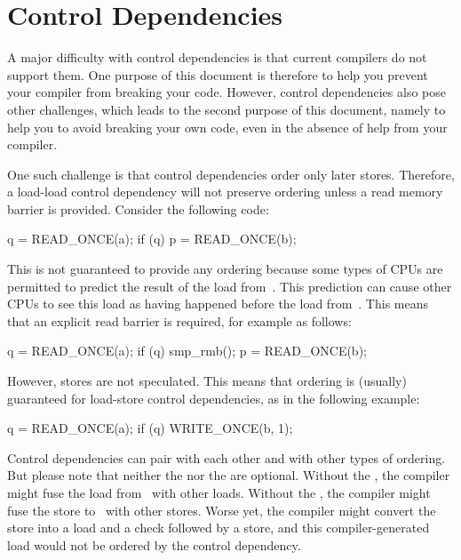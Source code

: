 \chapter{Control Dependencies}

A major difficulty with control dependencies is that current compilers
do not support them.
One purpose of this document is therefore to help you prevent your
compiler from breaking your code.
However, control dependencies also pose other challenges, which leads to the
second purpose of this document, namely to help you to avoid breaking
your own code, even in the absence of help from your compiler.

One such challenge is that control dependencies order only later stores.
Therefore, a load-load control dependency will not preserve ordering
unless a read memory barrier is provided.
Consider the following code:

\begin{VerbatimU}
	q = READ_ONCE(a);
	if (q)
		p = READ_ONCE(b);
\end{VerbatimU}

This is not guaranteed to provide any ordering because some types of CPUs
are permitted to predict the result of the load from~.
This prediction can cause other CPUs to see this load as having happened
before the load from~.
This means that an explicit read barrier is required, for example as follows:

\begin{VerbatimU}
	q = READ_ONCE(a);
	if (q) {
		smp_rmb();
		p = READ_ONCE(b);
	}
\end{VerbatimU}

However, stores are not speculated.
This means that ordering is (usually) guaranteed for load-store control
dependencies, as in the following example:

\begin{VerbatimU}
	q = READ_ONCE(a);
	if (q)
		WRITE_ONCE(b, 1);
\end{VerbatimU}

Control dependencies can pair with each other and with other types
of ordering.
But please note that neither the  nor the 
are optional.
Without the , the compiler might fuse the load from~
with other loads.
Without the , the compiler might fuse the store to~
with other stores.
Worse yet, the compiler might convert the store into a load and a check followed
by a store, and this compiler-generated load would not be ordered by
the control dependency.

